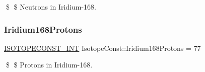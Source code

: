 \$ \$ Neutrons in Iridium-\/168. \mbox{\label{group___isotope_const-_iridium-_ir168_ga21a060d53eb3a0519d9d5acadb133c6e}} 
\subsubsection{\texorpdfstring{Iridium168\+Protons}{Iridium168Protons}}
{\footnotesize\ttfamily \mbox{\hyperlink{group___isotope_const-_macros_ga5f18360b3e99483a35c32d789e62621c}{I\+S\+O\+T\+O\+P\+E\+C\+O\+N\+S\+T\+\_\+\+I\+NT}} Isotope\+Const\+::\+Iridium168\+Protons = 77}

\$ \$ Protons in Iridium-\/168. 